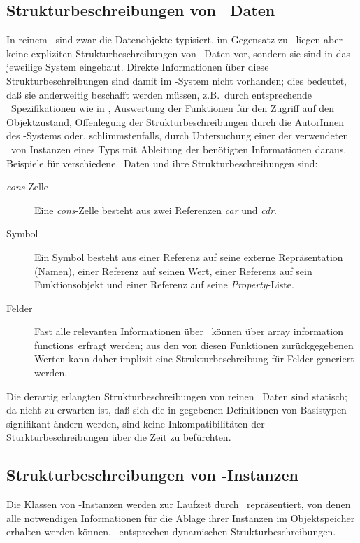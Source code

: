 \subsection{Strukturbeschreibungen von \protect\cl\ Daten}%
%
In reinem \cl\ sind zwar die Datenobjekte typisiert, im Gegensatz zu
\clos\ liegen aber keine expliziten Strukturbeschreibungen von
\cl\ Daten vor, sondern sie sind in das jeweilige System
\rglq{}eingebaut\rgrq. Direkte Informationen \"{u}ber diese
Strukturbeschreibungen sind damit im \cl-System nicht vorhanden; dies
bedeutet, da\ss{} sie anderweitig beschafft werden m\"{u}ssen, z.B.\ durch
entsprechende \cl\ Spezifikationen wie in
\cite{bib:st90}, Auswertung der Funktionen f\"{u}r den Zugriff auf den
Objektzustand, Offenlegung der Strukturbeschreibungen durch die
AutorInnen des \cl-Systems oder, schlimmstenfalls, durch Untersuchung
einer der verwendeten \representationforms\ von Instanzen eines Typs
mit Ableitung der ben\"{o}tigten Informationen daraus. Beispiele f\"{u}r
verschiedene \cl\ Daten und ihre Strukturbeschreibungen sind:
%
\begin{description}
%
\item[{\em cons\/}-Zelle] Eine {\em cons\/}-Zelle besteht aus
zwei Referenzen {\em car\/} und {\em cdr}.
%
\item[Symbol] Ein Symbol besteht aus einer Referenz auf seine externe
Repr\"{a}sentation (Namen), einer Referenz auf seinen Wert, einer
Referenz auf sein Funktionsobjekt und einer Referenz auf seine
{\em Property\/}-Liste.
%
\item[Felder] Fast alle relevanten Informationen \"{u}ber
\ k\"{o}nnen \"{u}ber
%
{array information functions}\ erfragt werden; aus den von diesen
Funktionen zur\"{u}ckgegebenen Werten kann daher implizit eine
Strukturbeschreibung f\"{u}r Felder generiert werden.
%
\end{description}
%
Die derartig erlangten Strukturbeschreibungen von reinen \cl\ Daten
sind statisch; da nicht zu erwarten ist, da\ss{} sich die in
\cite{bib:st90} gegebenen Definitionen von Basistypen signifikant
\"{a}ndern werden,  sind keine Inkompatibilit\"{a}ten der
Sturkturbeschreibungen \"{u}ber die Zeit zu bef\"{u}rchten.
%
\subsection{Strukturbeschreibungen von \clos-Instanzen}
%
Die Klassen von \clos-Instanzen werden zur Laufzeit durch
\clsmo[e]\ repr\"{a}sentiert, von denen alle notwendigen
Informationen f\"{u}r die Ablage ihrer Instanzen im Objektspeicher
erhalten werden k\"{o}nnen.  \clsmo[e]\ entsprechen dynamischen
Strukturbeschreibungen.
%
